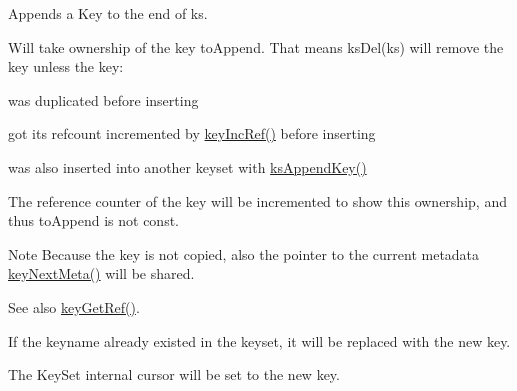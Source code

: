 Appends a Key to the end of {\ttfamily ks}. 

Will take ownership of the key {\ttfamily to\+Append}. That means ks\+Del(ks) will remove the key unless the key\+:
\begin{DoxyItemize}
\item was duplicated before inserting
\item got its refcount incremented by \hyperlink{group__key_ga6970a6f254d67af7e39f8e469bb162f1}{key\+Inc\+Ref()} before inserting
\item was also inserted into another keyset with \hyperlink{group__keyset_gaa5a1d467a4d71041edce68ea7748ce45}{ks\+Append\+Key()}
\end{DoxyItemize}

The reference counter of the key will be incremented to show this ownership, and thus {\ttfamily to\+Append} is not const.

\begin{DoxyNote}{Note}
Because the key is not copied, also the pointer to the current metadata \hyperlink{group__keymeta_ga4c88342f580a4291455a801af71ce048}{key\+Next\+Meta()} will be shared.
\end{DoxyNote}
\begin{DoxySeeAlso}{See also}
\hyperlink{group__key_ga4aabc4272506dd63161db2bbb42de8ae}{key\+Get\+Ref()}.
\end{DoxySeeAlso}
If the keyname already existed in the keyset, it will be replaced with the new key.

The Key\+Set internal cursor will be set to the new key.

